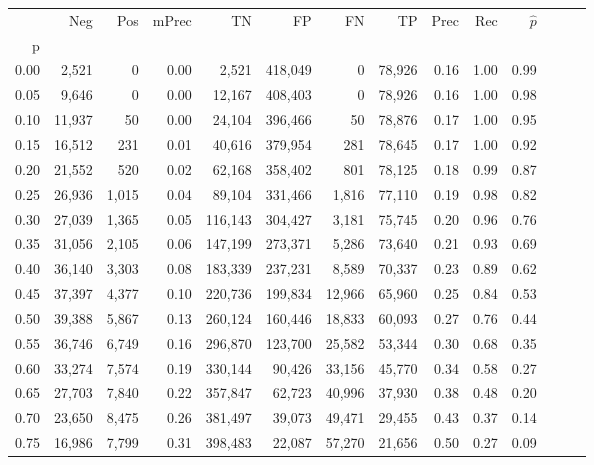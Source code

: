 \begin{tabular}{rrrrrrrrrrrrrr}
\toprule
{} &     Neg &    Pos & mPrec &       TN &       FP &      FN &      TP &  Prec &   Rec & $\hat{p}$ \\
p    &         &        &       &          &          &         &         &       &       &           \\
\midrule
0.00 &   2,521 &      0 &  0.00 &    2,521 &  418,049 &       0 &  78,926 &  0.16 &  1.00 &      0.99 \\
0.05 &   9,646 &      0 &  0.00 &   12,167 &  408,403 &       0 &  78,926 &  0.16 &  1.00 &      0.98 \\
0.10 &  11,937 &     50 &  0.00 &   24,104 &  396,466 &      50 &  78,876 &  0.17 &  1.00 &      0.95 \\
0.15 &  16,512 &    231 &  0.01 &   40,616 &  379,954 &     281 &  78,645 &  0.17 &  1.00 &      0.92 \\
0.20 &  21,552 &    520 &  0.02 &   62,168 &  358,402 &     801 &  78,125 &  0.18 &  0.99 &      0.87 \\
0.25 &  26,936 &  1,015 &  0.04 &   89,104 &  331,466 &   1,816 &  77,110 &  0.19 &  0.98 &      0.82 \\
0.30 &  27,039 &  1,365 &  0.05 &  116,143 &  304,427 &   3,181 &  75,745 &  0.20 &  0.96 &      0.76 \\
0.35 &  31,056 &  2,105 &  0.06 &  147,199 &  273,371 &   5,286 &  73,640 &  0.21 &  0.93 &      0.69 \\
0.40 &  36,140 &  3,303 &  0.08 &  183,339 &  237,231 &   8,589 &  70,337 &  0.23 &  0.89 &      0.62 \\
0.45 &  37,397 &  4,377 &  0.10 &  220,736 &  199,834 &  12,966 &  65,960 &  0.25 &  0.84 &      0.53 \\
0.50 &  39,388 &  5,867 &  0.13 &  260,124 &  160,446 &  18,833 &  60,093 &  0.27 &  0.76 &      0.44 \\
0.55 &  36,746 &  6,749 &  0.16 &  296,870 &  123,700 &  25,582 &  53,344 &  0.30 &  0.68 &      0.35 \\
0.60 &  33,274 &  7,574 &  0.19 &  330,144 &   90,426 &  33,156 &  45,770 &  0.34 &  0.58 &      0.27 \\
0.65 &  27,703 &  7,840 &  0.22 &  357,847 &   62,723 &  40,996 &  37,930 &  0.38 &  0.48 &      0.20 \\
0.70 &  23,650 &  8,475 &  0.26 &  381,497 &   39,073 &  49,471 &  29,455 &  0.43 &  0.37 &      0.14 \\
0.75 &  16,986 &  7,799 &  0.31 &  398,483 &   22,087 &  57,270 &  21,656 &  0.50 &  0.27 &      0.09 \\

\end{tabular}

